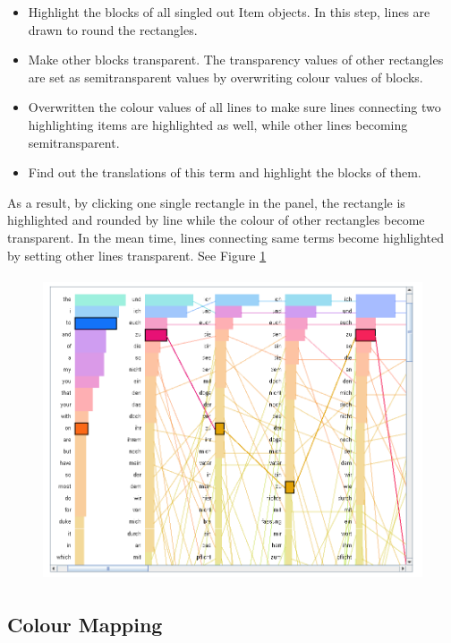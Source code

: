 \begin{itemize}
	\item \textbf{} Highlight the blocks of all singled out Item objects. In this step, lines are drawn to round the rectangles. 
	\item \textbf{} Make other blocks transparent. The transparency values of other rectangles are set as  semitransparent values by overwriting colour values of blocks.
	\item \textbf{} Overwritten the colour values of all lines to make sure lines connecting two highlighting items are highlighted as well, while other lines becoming semitransparent.
	\item \textbf{} Find out the translations of this term and highlight the blocks of them.	
\end{itemize}

As a result, by clicking one single rectangle in the panel, the rectangle is highlighted and rounded by line while the colour of other rectangles become transparent. In the mean time, lines connecting same terms become highlighted by setting other lines transparent. See Figure \ref{fig:highlightView}

\begin{figure}[H]
	\centering	
	\includegraphics[width=16cm, height=9cm]{Figs/Highlight-Terms}\\[1ex]
	\caption{}
	\label{fig:highlightView}
\end{figure} 

\subsection{Colour Mapping}

